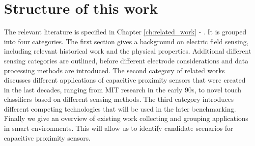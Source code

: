 
\section{Structure of this work}
The relevant literature is specified in Chapter \ref{ch:related_work} - \emph{}. It is grouped into four categories. The first section gives a background on electric field sensing, including relevant historical work and the physical properties. Additional different sensing categories are outlined, before different electrode considerations and data processing methods are introduced. The second category of related works discusses different applications of capacitive proximity sensors that were created in the last decades, ranging from MIT research in the early 90s, to novel touch classifiers based on different sensing methods. The third category introduces different competing technologies that will be used in the later benchmarking. Finally we give an overview of existing work collecting and grouping applications in smart environments. This will allow us to identify candidate scenarios for capacitive proximity sensors.

